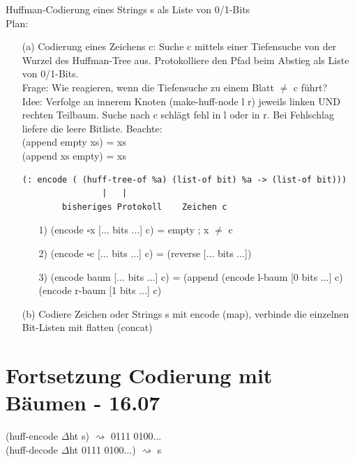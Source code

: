 \documentclass[a4paper, 20pt, openany]{book}
\begin{document}
Huffman-Codierung eines Strings s als Liste von 0/1-Bits\\
Plan:\\
\begin{enumerate}
\item[(a)] Codierung eines Zeichens c:
Suche c mittels einer Tiefensuche von der Wurzel des Huffman-Tree aus. Protokolliere den Pfad beim Abstieg als Liste von 0/1-Bits.\\
Frage: Wie reagieren, wenn die Tiefensuche zu einem Blatt $\ne$ c führt?\\
Idee: Verfolge an innerem Knoten (make-huff-node l r) jeweils linken UND rechten Teilbaum. Suche nach c schlägt fehl in l oder in r. Bei Fehlschlag liefere die leere Bitliste. Beachte:\\
(append empty xs) = xs\\
(append xs empty) = xs\\


\begin{lstlisting}
(: encode ( (huff-tree-of %a) (list-of bit) %a -> (list-of bit)))
				| 	|
		bisheriges Protokoll    Zeichen c
\end{lstlisting}

\begin{enumerate}
\item[1)] (encode $\square$x [... bits ...] c) = empty  ; x $\ne$ c
\item[2)] (encode $\square$c [... bits ...] c) = (reverse  [... bits ...])
\item[3)] (encode baum [... bits ...] c) = (append (encode l-baum [0 bits ...] c) (encode r-baum [1 bits ...] c)
\end{enumerate}

\item[(b)] Codiere Zeichen oder Strings s mit encode (map), verbinde die einzelnen Bit-Listen mit flatten (concat)

\end{enumerate}

\chapter{Fortsetzung Codierung mit Bäumen - 16.07}
(huff-encode $\Delta$ht s) $\rightsquigarrow$ 0111 0100...\\
(huff-decode $\Delta$ht 0111 0100...) $\rightsquigarrow$ s\\
\end{document}
